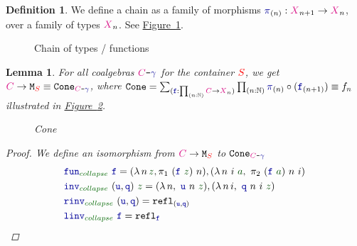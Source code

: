 \documentclass[twoside,11pt,openright]{report}
\theoremstyle{plain} %
\newtheorem{lem}[thm]{Lemma}
\theoremstyle{definition}
\newtheorem{defn}[thm]{Definition}%
\theoremstyle{remark}
\newcommand*{\figref}[1]{\hyperref[fig:#1]{Figure~\ref*{fig:#1}}}
\newcommand*{\term}[1]{\textcolor{green!30!black}{#1}} %
\newcommand*{\pathterm}[1]{\textcolor{green!40!black}{#1}}
\newcommand*{\type}[1]{\textcolor{magenta!90!black}{#1}}
\newcommand*{\container}[1]{\textcolor{red}{#1}}
\newcommand*{\coalg}[2]{#1\texttt{-}#2}
\newcommand*{\function}[1]{\textcolor{blue!60!black}{\ensuremath{\mathtt{#1}}}}
\newcommand*{\typeformer}[1]{\ensuremath{\mathtt{#1}}}
\begin{document}
\begin{defn}
  We define a chain as a family of morphisms \(\function{\pi}_{(n)} : \type{X}_{n+1} \rightarrow \type{X}_{n}\), over a family of types \(\type{X}_{n}\). See \figref{x-chain}.
  \begin{figure}[h]
    \centering
    \caption{Chain of types / functions}
    \label{fig:x-chain}
  \end{figure}  
\end{defn}
\begin{lem}\label{lem:function-to-M-type-is-cone}
  For all coalgebras \(\coalg{\type{C}}{\function{\gamma}}\) for the container \(\container{S}\), we get \(\type{C} \rightarrow \typeformer{M}_{\container{S}} \equiv \typeformer{Cone}_{\coalg{\type{C}}{\function{\gamma}}}\), where \(\typeformer{Cone} = \sum_{(\function{f} : \prod_{(n : \mathbb{N})} \type{C} \rightarrow \type{X}_n)} \prod_{(n : \mathbb{N})} \function{\pi}_{(n)} \circ (\function{f}_{(n+1)}) \equiv f_n\) illustrated in \figref{M-seq-cone}.
  \begin{figure}[h]
    \centering
    \caption{Cone}
    \label{fig:M-seq-cone}
  \end{figure}  
  \begin{proof}
    We define an isomorphism from \(\type{C} \rightarrow \typeformer{M}_{\container{S}}\) to \(\typeformer{Cone}_{\coalg{\type{C}}{\function{\gamma}}}\)
    \begin{align}
      &\function{fun}_{\pathterm{collapse}}~\function{f} = (\lambda\,n\,\term{z},\pi_1~(\function{f}~\term{z})~n),(\lambda\,n~i~\term{a},~\pi_2~(\function{f}~\term{a})~n~i) \\
      &\function{inv}_{\pathterm{collapse}}~(\function{u},\function{q})~\term{z} = (\lambda\,n,~\function{u}~n~\term{z}),(\lambda\,n\,i,~\function{q}~n~i~\term{z}) \\
      &\function{rinv}_{\pathterm{collapse}}~(\function{u},\function{q}) = \mathtt{refl}_{(\function{u},\function{q})} \\
      &\function{linv}_{\pathterm{collapse}}~\function{f} = \mathtt{refl}_{\function{f}}
    \end{align}
  \end{proof}
\end{lem}
\end{document}
